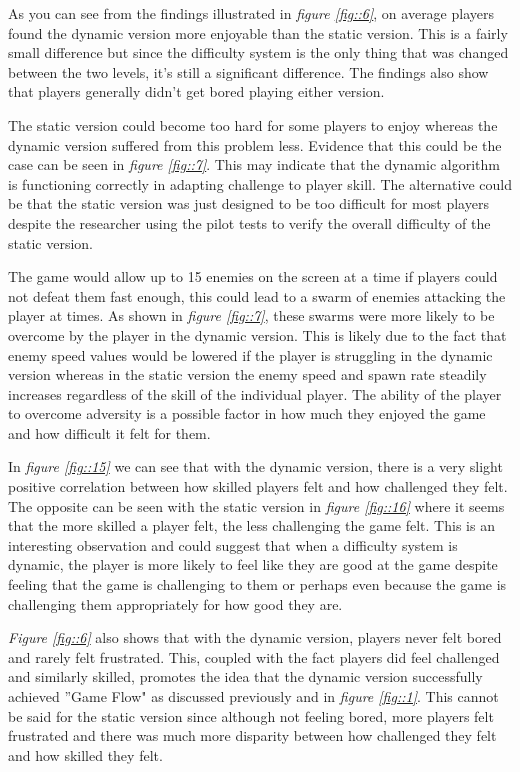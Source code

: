 \documentclass[journal]{IEEEtran}
\begin{document}
As you can see from the findings illustrated in \textit{figure \ref{fig::6}}, on average players found the dynamic version more enjoyable than the static version. This is a fairly small difference but since the difficulty system is the only thing that was changed between the two levels, it's still a significant difference. The findings also show that players generally didn't get bored playing either version. 

The static version could become too hard for some players to enjoy whereas the dynamic version suffered from this problem less. Evidence that this could be the case can be seen in \textit{figure \ref{fig::7}}. This may indicate that the dynamic algorithm is functioning correctly in adapting challenge to player skill. The alternative could be that the static version was just designed to be too difficult for most players despite the researcher using the pilot tests to verify the overall difficulty of the static version.

The game would allow up to 15 enemies on the screen at a time if players could not defeat them fast enough, this could lead to a swarm of enemies attacking the player at times. As shown in \textit{figure \ref{fig::7}}, these swarms were more likely to be overcome by the player in the dynamic version. This is likely due to the fact that enemy speed values would be lowered if the player is struggling in the dynamic version whereas in the static version the enemy speed and spawn rate steadily increases regardless of the skill of the individual player. The ability of the player to overcome adversity is a possible factor in how much they enjoyed the game and how difficult it felt for them.

In \textit{figure \ref{fig::15}} we can see that with the dynamic version, there is a very slight positive correlation between how skilled players felt and how challenged they felt. The opposite can be seen with the static version in \textit{figure \ref{fig::16}} where it seems that the more skilled a player felt, the less challenging the game felt. This is an interesting observation and could suggest that when a difficulty system is dynamic, the player is more likely to feel like they are good at the game despite feeling that the game is challenging to them or perhaps even because the game is challenging them appropriately for how good they are.

\textit{Figure \ref{fig::6}} also shows that with the dynamic version, players never felt bored and rarely felt frustrated. This, coupled with the fact players did feel challenged and similarly skilled, promotes the idea that the dynamic version successfully achieved ''Game Flow" as discussed previously and in \textit{figure \ref{fig::1}}. This cannot be said for the static version since although not feeling bored, more players felt frustrated and there was much more disparity between how challenged they felt and how skilled they felt. 
\end{document}
